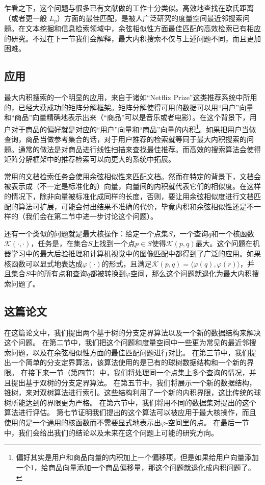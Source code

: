 \documentclass[twocolumn,a4paper]{article}
\begin{document}
乍看之下，这个问题与很多已有文献做的工作十分类似。高效地查找在欧氏距离（或者更一般 $L_p$）方面的最佳匹配，是被人广泛研究的度量空间最近邻搜索问题\cite{9}。在文本挖掘和信息检索领域中，余弦相似性方面最佳匹配的高效检索已有相应的研究\cite{1}。不过在下一节我们会解释，最大内积搜索不仅与上述问题不同，而且更加困难。

\subsection{应用}
最大内积搜索的一个明显的应用，来自于诸如“Netflix Prize”\cite{22, 21, 2}这类推荐系统中所用的，已经大获成功的矩阵分解框架。矩阵分解使得可用的数据可以用“用户”向量和“商品”向量精确地表示出来（“商品”可以是音乐或者电影）。在这个背景下，用户对于商品的偏好就是对应的“用户”向量和“商品”向量的内积\footnote{偏好其实是用户和商品向量的内积加上一个偏移项，但是如果给用户向量添加一个1，给商品向量添加一个商品偏移量，那这个问题就退化成内积问题了。}。如果把用户当做查询，商品当做参考集合的话，对于用户推荐的检索就等同于最大内积搜索的问题。通常的做法是对商品进行线性扫描来查找最佳推荐。而高效的搜索算法会使得矩阵分解框架中的推荐检索可以向更大的系统中拓展。

常用的文档检索任务会使用余弦相似性来匹配文档。然而在特定的背景下\cite{11}，文档会被表示成（不一定是标准化的）向量，向量间的内积就代表它们的相似度。在这样的情况下，除非向量被标准化成同样的长度，否则，要让用余弦相似度进行文档匹配的算法\cite{1}可扩展，可能会付出结果不准确的代价，毕竟内积和余弦相似性还是不一样的（我们会在第二节中进一步讨论这个问题）。

还有一个类似的问题就是最大核操作：给定一个点集$S$，一个查询$q$和一个核函数$\mathcal{K}(\cdot,\cdot)$，任务是，在集合$S$上找到一个点$p \in S$使得$\mathcal{K}(p,q)$最大。这个问题在机器学习中的最大后验推理\cite{20}和计算机视觉中的图像匹配\cite{23}中都得到了广泛的应用。如果核函数可以显式地表达成$\varphi(\cdot)$的形式，且满足$\mathcal{K}(p,q) = \langle \varphi(q), \varphi(r) \rangle$，并且集合$S$中的所有点和查询$q$都被转换到$\varphi$空间，那么这个问题就退化为最大内积搜索问题了。

\subsection{这篇论文}
在这篇论文中，我们提出两个基于树的分支定界算法以及一个新的数据结构来解决这个问题。
在第二节中，我们把这个问题和度量空间中一些更为常见的最近邻搜索问题，以及在余弦相似性方面的最佳匹配问题进行对比。
在第三节中，我们提出一个简单的分支定界算法，该算法使用的是已有的球树数据结构\cite{28}和一个新的界限。
在接下来一节（第四节）中，我们将处理同一个点集上多个查询的情况，并且提出基于双树的分支定界算法。
在第五节中，我们将展示一个新的数据结构，锥树，来对双树算法进行索引。这些结构利用了一个新的内积界限，这比传统的球树所能达到的界限更为严格。
在第六节中，我们将用不同的数据集对提出的这个算法进行评估。
第七节证明我们提出的这个算法可以被应用于最大核操作，而且使用的是一个通用的核函数而不需要显式地表示出$\varphi$-空间里的点。
在最后一节中，我们会给出我们的结论以及未来在这个问题上可能的研究方向。
\end{document}
